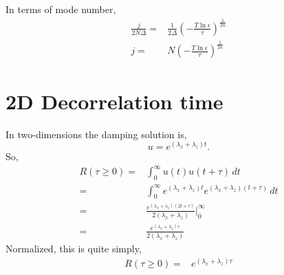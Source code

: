 \documentclass[11pt, oneside]{article}   	%
\begin{document}
In terms of mode number,
\begin{align}
\frac{j}{2 N \Delta} =& \frac{1}{2 \Delta} \left( -\frac{T \ln \epsilon}{ \tau} \right)^{\frac{1}{2n}} \\
j =&  N \left( -\frac{T \ln \epsilon}{ \tau} \right)^{\frac{1}{2n}}
\end{align}

%
\section{2D Decorrelation time}
%

In two-dimensions the damping solution is,
\begin{equation}
u = e^{ (\lambda_x+\lambda_z) t}.
\end{equation}
So,
\begin{align}
R(\tau \geq 0) =& \int_0^\infty u(t)u(t+\tau) \, dt \\
=&\int_0^\infty e^{(\lambda_x+\lambda_z)  t} e^{(\lambda_x+\lambda_z)  (t + \tau) } \, dt \\
=& \frac{e^{ (\lambda_x+\lambda_z) (2t + \tau)}}{2 (\lambda_x+\lambda_z) } \biggr\rvert_0^\infty \\
=&  \frac{e^{ (\lambda_x+\lambda_z) \tau }}{2 (\lambda_x+\lambda_z) } 
\end{align}
Normalized, this is quite simply,
\begin{align}
R(\tau \geq 0) =&  e^{ (\lambda_x+\lambda_z) \tau }
\end{align}
\end{document}
